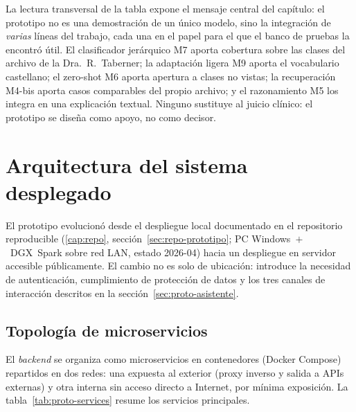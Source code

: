 La lectura transversal de la tabla expone el mensaje central del
capítulo: el prototipo no es una demostración de un único modelo, sino la
integración de \emph{varias} líneas del trabajo, cada una en el papel para
el que el banco de pruebas la encontró útil. El clasificador jerárquico
M7 aporta cobertura sobre las clases del archivo de la Dra.~R.~Taberner; la
adaptación ligera M9 aporta el vocabulario castellano; el zero-shot M6
aporta apertura a clases no vistas; la recuperación M4-bis aporta casos
comparables del propio archivo; y el razonamiento M5 los integra en una
explicación textual. Ninguno sustituye al juicio clínico: el prototipo se
diseña como apoyo, no como decisor.

\section{Arquitectura del sistema desplegado}
\label{sec:proto-arq}

El prototipo evolucionó desde el despliegue local documentado en el
repositorio reproducible (\ref{cap:repo}, sección~\ref{sec:repo-prototipo};
PC Windows~$+$~DGX~Spark sobre red LAN, estado 2026-04) hacia un despliegue
en servidor accesible públicamente. El cambio
no es solo de ubicación: introduce la necesidad de autenticación,
cumplimiento de protección de datos y los tres canales de interacción
descritos en la sección~\ref{sec:proto-asistente}.

\subsection{Topología de microservicios}
\label{sec:proto-micro}

El \emph{backend} se organiza como microservicios en contenedores
(Docker Compose) repartidos en dos redes: una expuesta al exterior (proxy
inverso y salida a APIs externas) y otra interna sin acceso directo a
Internet, por mínima exposición. La tabla~\ref{tab:proto-services} resume
los servicios principales.

